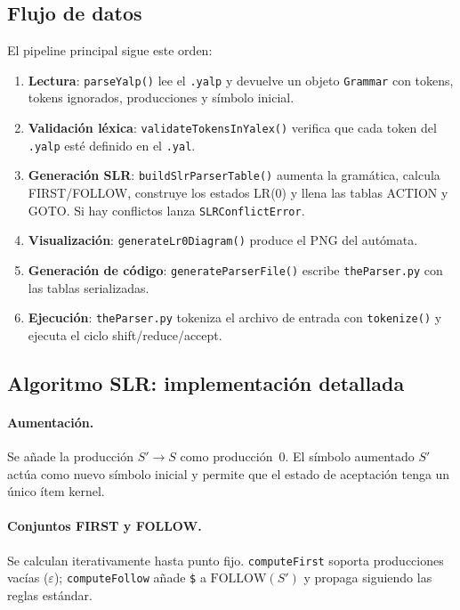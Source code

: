 \documentclass[11pt,a4paper]{article}
\begin{document}
\subsection{Flujo de datos}

El pipeline principal sigue este orden:

\begin{enumerate}[noitemsep]
  \item \textbf{Lectura}: \texttt{parseYalp()} lee el \texttt{.yalp} y devuelve
        un objeto \texttt{Grammar} con tokens, tokens ignorados, producciones y
        símbolo inicial.
  \item \textbf{Validación léxica}: \texttt{validateTokensInYalex()} verifica que
        cada token del \texttt{.yalp} esté definido en el \texttt{.yal}.
  \item \textbf{Generación SLR}: \texttt{buildSlrParserTable()} aumenta la
        gramática, calcula FIRST/FOLLOW, construye los estados LR(0) y llena
        las tablas ACTION y GOTO. Si hay conflictos lanza \texttt{SLRConflictError}.
  \item \textbf{Visualización}: \texttt{generateLr0Diagram()} produce el PNG del
        autómata.
  \item \textbf{Generación de código}: \texttt{generateParserFile()} escribe
        \texttt{theParser.py} con las tablas serializadas.
  \item \textbf{Ejecución}: \texttt{theParser.py} tokeniza el archivo de entrada
        con \texttt{tokenize()} y ejecuta el ciclo shift/reduce/accept.
\end{enumerate}

\subsection{Algoritmo SLR: implementación detallada}

\paragraph{Aumentación.} Se añade la producción $S' \to S$ como producción~0.
El símbolo aumentado $S'$ actúa como nuevo símbolo inicial y permite que el
estado de aceptación tenga un único ítem kernel.

\paragraph{Conjuntos FIRST y FOLLOW.} Se calculan iterativamente hasta punto
fijo. \texttt{computeFirst} soporta producciones vacías
($\varepsilon$); \texttt{computeFollow} añade \texttt{\$} a
$\text{FOLLOW}(S')$ y propaga siguiendo las reglas estándar.
\end{document}
